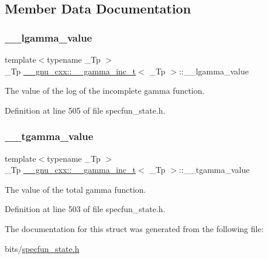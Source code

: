 \subsection{Member Data Documentation}
\mbox{\label{struct____gnu__cxx_1_1____gamma__inc__t_a193b3f7871e371363571fe90b1ce1767}} 
\subsubsection{\texorpdfstring{\+\_\+\+\_\+lgamma\+\_\+value}{\_\_lgamma\_value}}
{\footnotesize\ttfamily template$<$typename \+\_\+\+Tp $>$ \\
\+\_\+\+Tp \hyperlink{struct____gnu__cxx_1_1____gamma__inc__t}{\+\_\+\+\_\+gnu\+\_\+cxx\+::\+\_\+\+\_\+gamma\+\_\+inc\+\_\+t}$<$ \+\_\+\+Tp $>$\+::\+\_\+\+\_\+lgamma\+\_\+value}



The value of the log of the incomplete gamma function. 



Definition at line 505 of file specfun\+\_\+state.\+h.

\mbox{\label{struct____gnu__cxx_1_1____gamma__inc__t_a53d4ffc984c6685ce328caff424b5fe4}} 
\subsubsection{\texorpdfstring{\+\_\+\+\_\+tgamma\+\_\+value}{\_\_tgamma\_value}}
{\footnotesize\ttfamily template$<$typename \+\_\+\+Tp $>$ \\
\+\_\+\+Tp \hyperlink{struct____gnu__cxx_1_1____gamma__inc__t}{\+\_\+\+\_\+gnu\+\_\+cxx\+::\+\_\+\+\_\+gamma\+\_\+inc\+\_\+t}$<$ \+\_\+\+Tp $>$\+::\+\_\+\+\_\+tgamma\+\_\+value}



The value of the total gamma function. 



Definition at line 503 of file specfun\+\_\+state.\+h.



The documentation for this struct was generated from the following file\+:\begin{DoxyCompactItemize}
\item 
bits/\hyperlink{specfun__state_8h}{specfun\+\_\+state.\+h}\end{DoxyCompactItemize}

